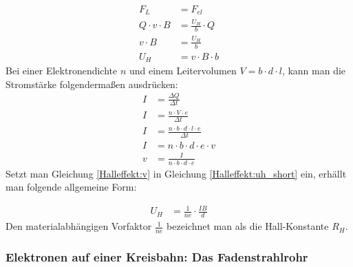 \documentclass[a4paper]{article}
\begin{document}
			\begin{equation}\label{Halleffekt:uh_short}
				\begin{aligned}
					F_L &= F_{el}\\
					Q\cdot v\cdot B &= \frac{U_H}{b}\cdot Q\\
					v\cdot B &= \frac{U_H}{b}\\
					U_H &= v\cdot B \cdot b
				\end{aligned}
			\end{equation}
			Bei einer Elektronendichte $n$ und einem Leitervolumen $V=b\cdot d\cdot l$, kann man die Stromstärke folgendermaßen ausdrücken:
			\begin{equation}\label{Halleffekt:v}
				\begin{aligned}
					I &= \frac{\Delta Q}{\Delta t}\\
					I &= \frac{n\cdot V\cdot e}{\Delta t}\\
					I &= \frac{n\cdot b\cdot d\cdot l\cdot e}{\Delta t}\\
					I &= n\cdot b\cdot d\cdot e\cdot v\\
					v &= \frac{I}{n\cdot b\cdot d\cdot e}
				\end{aligned}
			\end{equation}
			Setzt man Gleichung \ref{Halleffekt:v} in Gleichung  \ref{Halleffekt:uh_short} ein, erhällt man folgende allgemeine Form:
			
			\begin{equation}\label{Halleffekt:uh}
				\begin{aligned}
				U_H &= \frac{1}{ne}\cdot \frac{IB}{d}
				\end{aligned}
			\end{equation}
			Den materialabhängigen Vorfaktor $\frac{1}{ne}$ bezeichnet man als die Hall-Konstante $R_H$.
			
		
		\subsubsection{Elektronen auf einer Kreisbahn: Das Fadenstrahlrohr}
			
\end{document}
